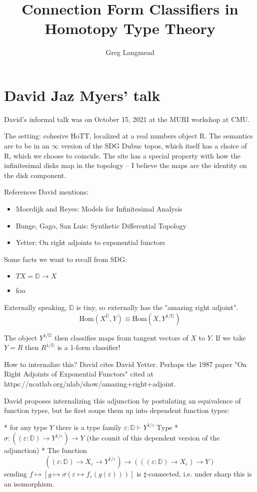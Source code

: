 \documentclass[17pt]{extarticle}
\title{Connection Form Classifiers in Homotopy Type Theory}
\begin{document}
\author{Greg Langmead}
\maketitle
\section{David Jaz Myers' talk}
David's informal talk was on October 15, 2021 at the MURI workshop at CMU.

The setting: cohesive HoTT, localized at a real numbers object R. 
The semantics are to be in an $\infty$ version of the SDG Dubuc topos, which itself has a choice of R, which we choose to coincide.
The site has a special property with how the infinitesimal disks map in the topology -- I believe the maps are the identity on the disk component.


References David mentions:
\begin{itemize}
\item Moerdijk and Reyes: Models for Infinitesimal Analysis \cite{moerdijk2013models}
\item Bunge, Gago, San Luis: Synthetic Differential Topology \cite{bunge2018synthetic}
\item Yetter: On right adjoints to exponential functors \cite{yetter1987right}
\end{itemize}

Some facts we want to recall from SDG: 
\begin{itemize}
	\item $TX = \mathbb{D}\to X$
	\item foo
\end{itemize}

Externally speaking, $\mathbb{D}$ is tiny, so externally has the "amazing right adjoint". $$\mathrm{Hom}(X^{\mathbb{D}}, Y) \equiv \mathrm{Hom}(X, Y^{1/\mathbb{D}})$$ 

The object $Y^{1/\mathbb{D}}$ then classifies maps from tangent vectors of $X$ to $Y$. If we take $Y=R$ then $R^{1/\mathbb{D}}$ is a 1-form classifier!

How to internalize this? David cites David Yetter. Perhaps the 1987 paper "On Right Adjoints of Exponential Functors" cited at https://ncatlab.org/nlab/show/amazing+right+adjoint.

David proposes internalizing this adjunction by postulating an equivalence of function types, but he first soups them up into dependent function types:

* for any type $Y$ there is a type family $\varepsilon: \mathbb{D}\vdash Y^{1/\varepsilon}\  \mathrm{Type}$
* $\sigma:((\varepsilon: \mathbb{D}) \to Y^{1/\varepsilon}) \to Y$ (the counit of this dependent version of the adjunction)
* The function $$((\varepsilon: \mathbb{D}) \to X_{\varepsilon} \to Y^{1/\varepsilon}) \to (((\varepsilon: \mathbb{D})\to X_{\varepsilon}) \to Y)$$ sending $f\mapsto [g\mapsto \sigma(\varepsilon\mapsto f_{\varepsilon}(g(\varepsilon)))]$ is $\sharp$-connected, i.e. under sharp this is an isomorphism.
\end{document}
